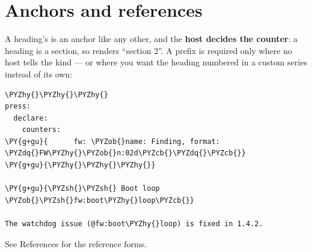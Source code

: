 \documentclass[a4paper,twoside]{article}
\begin{document}
\section{Anchors and references}
A heading's  is an anchor like any other, and the \textbf{host
decides the counter}: a heading is a section, so  renders
\enquote{section 2}. A prefix is required only where no host tells the kind --- or where
you want the heading numbered in a custom series instead of its
own:
\begin{tscode}[lang=md, engine=pygments]
\begin{Verbatim}[commandchars=\\\{\},breaklines, breakanywhere, commandchars=\\\{\}]
\PYZhy{}\PYZhy{}\PYZhy{}
press:
  declare:
    counters:
\PY{g+gu}{      fw: \PYZob{}name: Finding, format: \PYZdq{}FW\PYZhy{}\PYZob{}n:02d\PYZcb{}\PYZdq{}\PYZcb{}}
\PY{g+gu}{\PYZhy{}\PYZhy{}\PYZhy{}}

\PY{g+gu}{\PYZsh{}\PYZsh{} Boot loop \PYZob{}\PYZsh{}fw:boot\PYZhy{}loop\PYZcb{}}

The watchdog issue (@fw:boot\PYZhy{}loop) is fixed in 1.4.2.
\end{Verbatim}
\end{tscode}
See References for the reference forms.
\end{document}
